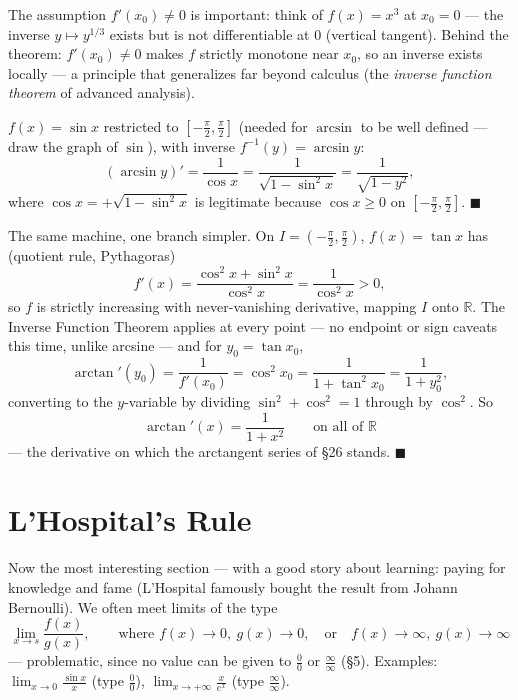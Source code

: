 \documentclass[11pt]{report}
\begin{document}
\begin{rembox}
The assumption $f'(x_0) \neq 0$ is important: think of $f(x) = x^3$ at $x_0 = 0$ --- the inverse $y \mapsto y^{1/3}$ exists but is not differentiable at $0$ (vertical tangent). Behind the theorem: $f'(x_0) \neq 0$ makes $f$ strictly monotone near $x_0$, so an inverse exists locally --- a principle that generalizes far beyond calculus (the \emph{inverse function theorem} of advanced analysis).
\end{rembox}

\begin{exbox}[Arcsine]
$f(x) = \sin x$ restricted to $\left[-\tfrac\pi2, \tfrac\pi2\right]$ (needed for $\arcsin$ to be well defined --- draw the graph of $\sin$), with inverse $f^{-1}(y) = \arcsin y$:
\[
(\arcsin y)' = \frac{1}{\cos x} = \frac{1}{\sqrt{1 - \sin^2 x}} = \frac{1}{\sqrt{1 - y^2}},
\]
where $\cos x = +\sqrt{1 - \sin^2 x}$ is legitimate because $\cos x \geq 0$ on $\left[-\tfrac\pi2, \tfrac\pi2\right]$. \hfill $\blacksquare$
\end{exbox}

\begin{exbox}[Arctangent (HW)]
The same machine, one branch simpler. On $I = \left( -\tfrac\pi2, \tfrac\pi2 \right)$, $f(x) = \tan x$ has (quotient rule, Pythagoras)
\[
f'(x) = \frac{\cos^2 x + \sin^2 x}{\cos^2 x} = \frac{1}{\cos^2 x} > 0,
\]
so $f$ is strictly increasing with never-vanishing derivative, mapping $I$ onto $\mathbb{R}$. The Inverse Function Theorem applies at every point --- no endpoint or sign caveats this time, unlike arcsine --- and for $y_0 = \tan x_0$,
\[
\arctan'(y_0) = \frac{1}{f'(x_0)} = \cos^2 x_0 = \frac{1}{1 + \tan^2 x_0} = \frac{1}{1 + y_0^2},
\]
converting to the $y$-variable by dividing $\sin^2 + \cos^2 = 1$ through by $\cos^2$. So
\[
\arctan'(x) = \frac{1}{1+x^2} \qquad \text{on all of } \mathbb{R}
\]
--- the derivative on which the arctangent series of \S 26 stands. \hfill $\blacksquare$
\end{exbox}


\section{L'Hospital's Rule}

Now the most interesting section --- with a good story about learning: paying for knowledge and fame (L'Hospital famously bought the result from Johann Bernoulli). We often meet limits of the type
\[
\lim_{x\to s} \frac{f(x)}{g(x)}, \qquad \text{where } f(x) \to 0,\ g(x) \to 0, \quad \text{or} \quad f(x) \to \infty,\ g(x) \to \infty
\]
--- problematic, since no value can be given to $\tfrac00$ or $\tfrac\infty\infty$ (\S 5). Examples: $\lim_{x\to0}\tfrac{\sin x}{x}$ (type $\tfrac00$), $\lim_{x\to+\infty} \tfrac{x}{e^x}$ (type $\tfrac\infty\infty$).
\end{document}
